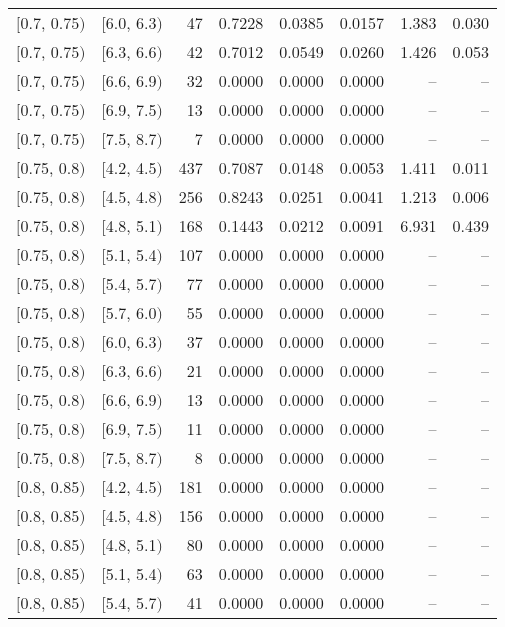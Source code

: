 \begin{longtable}{| l | l | r | r | r | r | r | r |}
        $[$0.7, 0.75$)$ & $[$6.0, 6.3$)$ & 47 & 0.7228 & 0.0385 & 0.0157 & 1.383 & 0.030 \\
        $[$0.7, 0.75$)$ & $[$6.3, 6.6$)$ & 42 & 0.7012 & 0.0549 & 0.0260 & 1.426 & 0.053 \\
        $[$0.7, 0.75$)$ & $[$6.6, 6.9$)$ & 32 & 0.0000 & 0.0000 & 0.0000 & -- & -- \\
        $[$0.7, 0.75$)$ & $[$6.9, 7.5$)$ & 13 & 0.0000 & 0.0000 & 0.0000 & -- & -- \\
        $[$0.7, 0.75$)$ & $[$7.5, 8.7$)$ & 7 & 0.0000 & 0.0000 & 0.0000 & -- & -- \\
        $[$0.75, 0.8$)$ & $[$4.2, 4.5$)$ & 437 & 0.7087 & 0.0148 & 0.0053 & 1.411 & 0.011 \\
        $[$0.75, 0.8$)$ & $[$4.5, 4.8$)$ & 256 & 0.8243 & 0.0251 & 0.0041 & 1.213 & 0.006 \\
        $[$0.75, 0.8$)$ & $[$4.8, 5.1$)$ & 168 & 0.1443 & 0.0212 & 0.0091 & 6.931 & 0.439 \\
        $[$0.75, 0.8$)$ & $[$5.1, 5.4$)$ & 107 & 0.0000 & 0.0000 & 0.0000 & -- & -- \\
        $[$0.75, 0.8$)$ & $[$5.4, 5.7$)$ & 77 & 0.0000 & 0.0000 & 0.0000 & -- & -- \\
        $[$0.75, 0.8$)$ & $[$5.7, 6.0$)$ & 55 & 0.0000 & 0.0000 & 0.0000 & -- & -- \\
        $[$0.75, 0.8$)$ & $[$6.0, 6.3$)$ & 37 & 0.0000 & 0.0000 & 0.0000 & -- & -- \\
        $[$0.75, 0.8$)$ & $[$6.3, 6.6$)$ & 21 & 0.0000 & 0.0000 & 0.0000 & -- & -- \\
        $[$0.75, 0.8$)$ & $[$6.6, 6.9$)$ & 13 & 0.0000 & 0.0000 & 0.0000 & -- & -- \\
        $[$0.75, 0.8$)$ & $[$6.9, 7.5$)$ & 11 & 0.0000 & 0.0000 & 0.0000 & -- & -- \\
        $[$0.75, 0.8$)$ & $[$7.5, 8.7$)$ & 8 & 0.0000 & 0.0000 & 0.0000 & -- & -- \\
        $[$0.8, 0.85$)$ & $[$4.2, 4.5$)$ & 181 & 0.0000 & 0.0000 & 0.0000 & -- & -- \\
        $[$0.8, 0.85$)$ & $[$4.5, 4.8$)$ & 156 & 0.0000 & 0.0000 & 0.0000 & -- & -- \\
        $[$0.8, 0.85$)$ & $[$4.8, 5.1$)$ & 80 & 0.0000 & 0.0000 & 0.0000 & -- & -- \\
        $[$0.8, 0.85$)$ & $[$5.1, 5.4$)$ & 63 & 0.0000 & 0.0000 & 0.0000 & -- & -- \\
        $[$0.8, 0.85$)$ & $[$5.4, 5.7$)$ & 41 & 0.0000 & 0.0000 & 0.0000 & -- & -- \\

\end{longtable}
